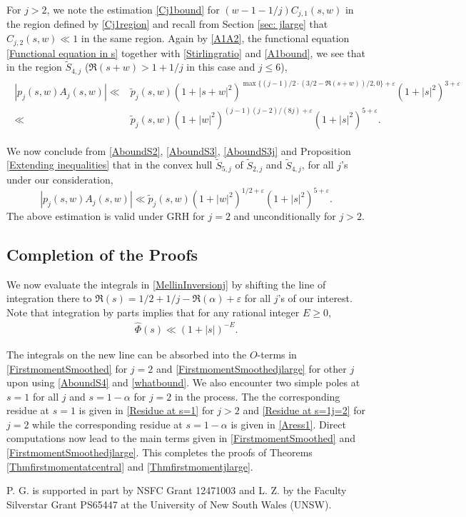 \documentclass[twoside,leqno,10pt, A4]{amsart}
\begin{document}
  For $j>2$, we note the estimation \eqref{Cj1bound}  for $(w-1-1/j)C_{j,1}(s,w)$ in the region defined by \eqref{Cj1region} and recall from Section \ref{sec: jlarge} that $C_{j,2}(s,w) \ll 1$ in the same region. Again by \eqref{A1A2}, the functional equation \eqref{Functional equation in s} together with \eqref{Stirlingratio} and \eqref{A1bound}, we see that in the region
$\widetilde S_{4,j}$ ($\Re(s+w)>1+1/j$ in this case and $j \leq 6$),
\begin{align} \label{AboundS3j}
\begin{split}
		|p_j(s,w)A_j(s,w)|\ll& \widetilde p_j(s,w)(1+|s+w|^2)^{\max \{(j-1)/2 \cdot (3/2-\Re(s+w))/2, 0\} +\varepsilon}(1+|s|^2)^{3+\varepsilon} \\
\ll & \widetilde p_j(s,w) (1+|w|^2)^{(j-1)(j-2)/(8j)+\varepsilon}(1+|s|^2)^{5+\varepsilon}.
\end{split}
\end{align}

 We now conclude from \eqref{AboundS2},  \eqref{AboundS3}, \eqref{AboundS3j} and Proposition \ref{Extending inequalities} that in the convex hull $\widetilde S_{5,j}$ of $\widetilde S_{2,j}$ and $\widetilde S_{4,j}$, for all $j$'s under our consideration,
\begin{equation}
\label{AboundS4}
		|p_j(s,w)A_j(s,w)|\ll \widetilde p_j(s,w)(1+|w|^2)^{1/2+\varepsilon}(1+|s|^2)^{5+\varepsilon}.
\end{equation}
 The above estimation is valid under GRH for $j=2$ and unconditionally for $j>2$.

\subsection{Completion of the Proofs}

We now evaluate the integrals in \eqref{MellinInversionj} by shifting the line of integration there to $\Re(s)=1/2+1/j-\Re(\alpha)+\varepsilon$ for all $j$'s of our interest.  Note that integration by parts implies that for any rational integer $E \geq 0$,
\begin{align} \label{whatbound}
 \widehat \Phi(s)  \ll  (1+|s|)^{-E}.
\end{align}

The integrals on the new line can be absorbed into the $O$-terms in \eqref{FirstmomentSmoothed} for $j=2$ and \eqref{FirstmomentSmoothedjlarge} for other $j$ upon using \eqref{AboundS4} and \eqref{whatbound}.  We also encounter two simple poles at $s=1$ for all $j$ and $s=1-\alpha$ for $j=2$ in the process. The the corresponding residue at $s=1$ is given in \eqref{Residue at s=1} for $j>2$ and \eqref{Residue at s=1j=2} for $j=2$ while the corresponding residue at $s=1-\alpha$ is given in \eqref{Aress1}. Direct computations now lead to the main terms given in \eqref{FirstmomentSmoothed} and \eqref{FirstmomentSmoothedjlarge}. This completes the proofs of Theorems \ref{Thmfirstmomentatcentral} and \ref{Thmfirstmomentjlarge}.

\vspace*{.5cm}

   P. G. is supported in part by NSFC Grant 12471003 and L. Z. by the Faculty Silverstar Grant PS65447 at the
University of New South Wales (UNSW).



\end{document}
